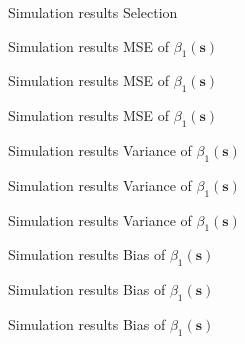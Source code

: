 \documentclass[12pt,t]{beamer}
\newcommand{\subt}[1]{{\footnotesize \color{subtitle} {#1}}}
\begin{document}
\begin{frame}{Simulation results}
\subt{Selection}
\hspace{-10mm}
\note{}
\end{frame}


\begin{frame}{Simulation results}
\subt{MSE of $\beta_1(\bm{s})$}

\note{}
\end{frame}


\begin{frame}{Simulation results}
\subt{MSE of $\beta_1(\bm{s})$}

\note{}
\end{frame}


\begin{frame}{Simulation results}
\subt{MSE of $\beta_1(\bm{s})$}

\note{}
\end{frame}





\begin{frame}{Simulation results}
\subt{Variance of $\beta_1(\bm{s})$}

\note{}
\end{frame}


\begin{frame}{Simulation results}
\subt{Variance of $\beta_1(\bm{s})$}

\note{}
\end{frame}


\begin{frame}{Simulation results}
\subt{Variance of $\beta_1(\bm{s})$}

\note{}
\end{frame}




\begin{frame}{Simulation results}
\subt{Bias of $\beta_1(\bm{s})$}

\note{}
\end{frame}


\begin{frame}{Simulation results}
\subt{Bias of $\beta_1(\bm{s})$}

\note{}
\end{frame}


\begin{frame}{Simulation results}
\subt{Bias of $\beta_1(\bm{s})$}

\note{}
\end{frame}
\end{document}
